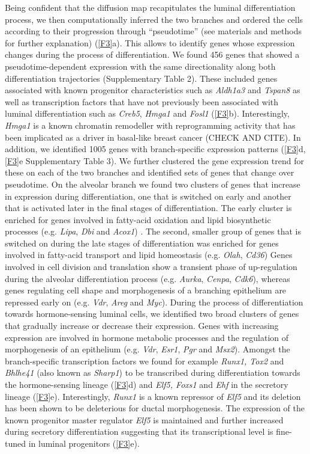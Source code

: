 \documentclass[titlepage, 12pt, oneside]{amsart}
\begin{document}
Being confident that the diffusion map recapitulates the luminal differentiation process, we then computationally inferred the two branches and ordered the cells according to their progression through ``pseudotime''\autocite{Haghverdi2016} (see materials and methods for further explanation) (\autoref{F3}a).
This allows to identify genes whose expression changes during the process of differentiation.
We found 456 genes that showed a pseudotime-dependent expression with the same directionality along both differentiation trajectories (Supplementary Table 2).
These included genes associated with known progenitor characteristics such as \textit{Aldh1a3} and \textit{Tspan8} as well as transcription factors that have not previously been associated with luminal differentiation such as \textit{Creb5}, \textit{Hmga1} and \textit{Fosl1} (\autoref{F3}b).
Interestingly, \textit{Hmga1} is a known chromatin remodeller with reprogramming activity that has been implicated as a driver in basal-like breast cancer (CHECK AND CITE).
In addition, we identified 1005 genes with branch-specific expression patterns (\autoref{F3}d, \autoref{F3}e Supplementary Table 3).
We further clustered the gene expression trend for these on each of the two branches and identified sets of genes that change over pseudotime.
On the alveolar branch we found two clusters of genes that increase in expression during differentiation, one that is switched on early and another that is activated later in the final stages of differentiation.
The early cluster is enriched for genes involved in fatty-acid oxidation and lipid biosynthetic processes (e.g. \textit{Lipa}, \textit{Dbi} and \textit{Acox1}) .
The second, smaller group of genes that is switched on during the late stages of differentiation was enriched for genes involved in fatty-acid transport and lipid homeostasis (e.g. \textit{Olah}, \textit{Cd36})
Genes involved in cell division and translation show a transient phase of up-regulation during the alveolar differentiation process (e.g. \textit{Aurka}, \textit{Cenpa}, \textit{Cdk6}), whereas genes regulating cell shape and morphogenesis of a branching epithelium are repressed early on (e.g. \textit{Vdr}, \textit{Areg} and \textit{Myc}).
During the process of differentiation towards hormone-sensing luminal cells, we identified two broad clusters of genes that gradually increase or decrease their expression.
Genes with increasing expression are involved in hormone metabolic processes and the regulation of morphogenesis of an epithelium (e.g. \textit{Vdr}, \textit{Esr1}, \textit{Pgr} and \textit{Msx2}).
Amongst the branch-specific transcription factors we found for example \textit{Runx1, Tox2} and \textit{Bhlhe41} (also known as \textit{Sharp1}) to be transcribed during differentiation towards the hormone-sensing lineage (\autoref{F3}d) and \textit{Elf5, Foxs1} and \textit{Ehf} in the secretory lineage (\autoref{F3}e).
Interestingly, \textit{Runx1} is a known repressor of \textit{Elf5} and its deletion has been shown to be deleterious for ductal morphogenesis\autocite{VanBragt2014}.
The expression of the known progenitor master regulator \textit{Elf5} is maintained and further increased during secretory differentiation suggesting that its transcriptional level is fine-tuned in luminal progenitors (\autoref{F3}e).
\end{document}
